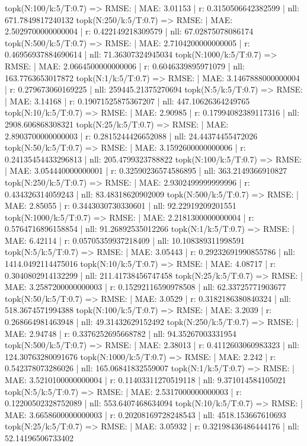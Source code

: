topk(N:100/k:5/T:0.7) => RMSE: | MAE: 3.01153 | r: 0.3150506642382599 | nll: 671.7849817240132
topk(N:250/k:5/T:0.7) => RMSE: | MAE: 2.5029700000000004 | r: 0.422149218309579 | nll: 67.02875078086174
topk(N:500/k:5/T:0.7) => RMSE: | MAE: 2.7104200000000005 | r: 0.46956937884690614 | nll: 71.36307324945034
topk(N:1000/k:5/T:0.7) => RMSE: | MAE: 2.0664500000000006 | r: 0.6046339895971079 | nll: 163.7763653017872
topk(N:1/k:5/T:0.7) => RMSE: | MAE: 3.1467888000000004 | r: 0.279673060169225 | nll: 259445.21375270694
topk(N:5/k:5/T:0.7) => RMSE: | MAE: 3.14168 | r: 0.19071525875367207 | nll: 447.10626364249765
topk(N:10/k:5/T:0.7) => RMSE: | MAE: 2.90985 | r: 0.17994082389117316 | nll: 2908.606868308321
topk(N:25/k:5/T:0.7) => RMSE: | MAE: 2.8903700000000003 | r: 0.2815244426652088 | nll: 24.44374455472026
topk(N:50/k:5/T:0.7) => RMSE: | MAE: 3.1592600000000006 | r: 0.24135454433296813 | nll: 205.4799323788822
topk(N:100/k:5/T:0.7) => RMSE: | MAE: 3.054440000000001 | r: 0.32590236574586895 | nll: 363.2149366910827
topk(N:250/k:5/T:0.7) => RMSE: | MAE: 2.9302499999999996 | r: 0.434326314059243 | nll: 83.48318620902009
topk(N:500/k:5/T:0.7) => RMSE: | MAE: 2.85055 | r: 0.3443030730330601 | nll: 92.22919209201551
topk(N:1000/k:5/T:0.7) => RMSE: | MAE: 2.2181300000000004 | r: 0.5764716896158854 | nll: 91.26892535012266
topk(N:1/k:5/T:0.7) => RMSE: | MAE: 6.42114 | r: 0.05705359937218409 | nll: 10.108389311998591
topk(N:5/k:5/T:0.7) => RMSE: | MAE: 3.05443 | r: 0.29232691990855786 | nll: 1414.0492114475016
topk(N:10/k:5/T:0.7) => RMSE: | MAE: 4.08717 | r: 0.3040802914132299 | nll: 211.41738456747458
topk(N:25/k:5/T:0.7) => RMSE: | MAE: 3.2587200000000003 | r: 0.15292116590978508 | nll: 62.33725771903677
topk(N:50/k:5/T:0.7) => RMSE: | MAE: 3.0529 | r: 0.3182186380840324 | nll: 518.3674571994388
topk(N:100/k:5/T:0.7) => RMSE: | MAE: 3.2039 | r: 0.268664981463948 | nll: 49.31432629152492
topk(N:250/k:5/T:0.7) => RMSE: | MAE: 2.94748 | r: 0.3376252695668782 | nll: 94.35267003331954
topk(N:500/k:5/T:0.7) => RMSE: | MAE: 2.38013 | r: 0.4112603060983323 | nll: 124.30763280091676
topk(N:1000/k:5/T:0.7) => RMSE: | MAE: 2.242 | r: 0.542378073286026 | nll: 165.06841832559007
topk(N:1/k:5/T:0.7) => RMSE: | MAE: 3.5210100000000004 | r: 0.11403311270519118 | nll: 9.371014584105021
topk(N:5/k:5/T:0.7) => RMSE: | MAE: 2.5317000000000003 | r: 0.12200502328752089 | nll: 553.6407468634094
topk(N:10/k:5/T:0.7) => RMSE: | MAE: 3.6658600000000003 | r: 0.20208169728248543 | nll: 4518.153667610693
topk(N:25/k:5/T:0.7) => RMSE: | MAE: 3.05932 | r: 0.32198436486444176 | nll: 52.14196506733402

